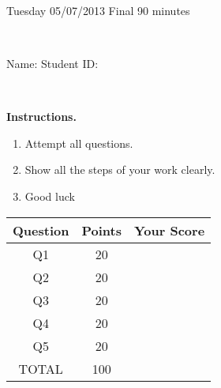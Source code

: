 \documentclass[12pt, oneside]{amsart}
\newcommand{\one}{20}
\newcommand{\two}{20}
\newcommand{\three}{20}
\newcommand{\four}{20}
\begin{document}
%
 
\begin{center}
\hrulefill\\
{\bf \textsf{\raisebox{-0.10cm}{Spring 2013: MATH 240} \hspace{\fill} 
\raisebox{-0.10cm}{Topology} \hspace{\fill}
\raisebox{-0.10cm}{David Karapetyan}}}\\
\hrulefill\\
{\large \rule{0cm}{1.2cm} \textsf{Tuesday 05/07/2013} \hfill
\textsf{Final} \hfill  \textsf{90 minutes}}\\
{\large\rule{0cm}{1.2cm}\textsf{Name: \framebox[2.9in]{\rule{0cm}{0.8cm}} 
\hspace{\fill}
Student ID: \framebox[2.1in]{\rule{0cm}{0.8cm}}}}\\
\end{center}
\vspace{0.8cm}

\noindent
{\bf \textsf{Instructions.}}

\begin{enumerate}
\item Attempt all questions.   
\item Show all the steps of your work clearly.  
\item Good luck 
\end{enumerate}

\vfill


\begin{center}
{\large
\begin{tabular}{|c|c|c|}
\hline
\rule[-0.3cm]{0cm}{1cm}
\textsf{Question} & \textsf{Points} &  \textsf{Your Score} \\
\hline
\hline
\rule[-0.3cm]{0cm}{1cm}
\textsf{ Q1} & \one &\\
\hline
\rule[-0.3cm]{0cm}{1cm}
\textsf{ Q2} & \two &\\
\hline
\rule[-0.3cm]{0cm}{1cm}
\textsf{ Q3} & \three &\\
\hline
\rule[-0.3cm]{0cm}{1cm}
\textsf{ Q4} & \four &\\
\hline
\rule[-0.3cm]{0cm}{1cm}
\textsf{ Q5} & \four &\\
\hline
\rule[-0.3cm]{0cm}{1cm}
 \textsf{ TOTAL} & 100 & \\
 \hline
 \end{tabular}
} 

\end{center}
\end{document}
